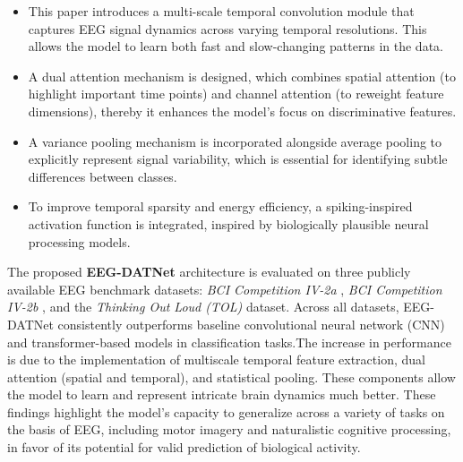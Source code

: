 \documentclass[pdflatex,sn-mathphys-num]{sn-jnl}%
\theoremstyle{thmstyleone}%
\theoremstyle{thmstyletwo}%
\theoremstyle{thmstylethree}%
\begin{document}
\begin{itemize}
    \item This paper introduces a multi-scale temporal convolution module that captures EEG signal dynamics across varying temporal resolutions. This allows the model to learn both fast and slow-changing patterns in the data.
    \item A dual attention mechanism is designed, which combines spatial attention (to highlight important time points) and channel attention (to reweight feature dimensions), thereby it enhances the model’s focus on discriminative features.
    
    \item A variance pooling mechanism is incorporated alongside average pooling to explicitly represent signal variability, which is essential for identifying subtle differences between classes.

    \item To improve temporal sparsity and energy efficiency, a spiking-inspired activation function is integrated, inspired by biologically plausible neural processing models.
\end{itemize}

The proposed \textbf{EEG-DATNet} architecture is evaluated on three publicly available EEG benchmark datasets: \textit{BCI Competition IV-2a} \cite{tangermann2012review}, \textit{BCI Competition IV-2b} \cite{leeb2008graz2b}, and the \textit{Thinking Out Loud (TOL)} \cite{nieto2022thinking} dataset. Across all datasets, EEG-DATNet consistently outperforms baseline convolutional neural network (CNN) and transformer-based models in classification tasks.The increase in performance is due to the implementation of multiscale temporal feature extraction, dual attention (spatial and temporal), and statistical pooling. These components allow the model to learn and represent intricate brain dynamics much better. These findings highlight the model's capacity to generalize across a variety of tasks on the basis of EEG, including motor imagery and naturalistic cognitive processing, in favor of its potential for valid prediction of biological activity.



\end{document}
